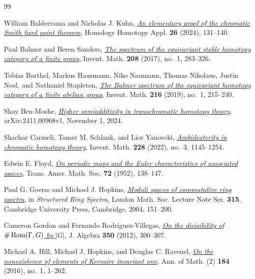 \begin{thebibliography}{99}

William Balderrama and Nicholas J. Kuhn,
\href{https://arxiv.org/abs/2303.02022}
{\emph{An elementary proof of the chromatic Smith fixed point theorem}},
Homology Homotopy Appl. \textbf{26} (2024), 131--140.

Paul Balmer and Beren Sanders,
\href{https://www.sas.rochester.edu/mth/sites/doug-ravenel/otherpapers/Spc_SHG.pdf}
{\emph{The spectrum of the equivariant stable homotopy category of a finite group}},
Invent. Math. \textbf{208} (2017), no.~1, 283--326.

Tobias Barthel, Markus Hausmann, Niko Naumann, Thomas Nikolaus,
Justin Noel, and Nathaniel Stapleton,
\href{https://doi.org/10.1007/s00222-018-0846-5}
{\emph{The Balmer spectrum of the equivariant homotopy category of a finite abelian group}},
Invent. Math. \textbf{216} (2019), no.~1, 215--240.

Shay Ben-Moshe,
\href{https://arxiv.org/abs/2411.00968v1}
{\emph{Higher semiadditivity in transchromatic homotopy theory}},
arXiv:2411.00968v1, November 1, 2024.

Shachar Carmeli, Tomer M. Schlank, and Lior Yanovski,
\href{https://doi.org/10.1007/s00222-022-01099-9}
{\emph{Ambidexterity in chromatic homotopy theory}},
Invent. Math. \textbf{228} (2022), no.~3, 1145--1254.

Edwin E. Floyd,
\href{https://doi.org/10.1090/S0002-9947-1952-0046039-4}
{\emph{On periodic maps and the Euler characteristics of associated spaces}},
Trans. Amer. Math. Soc. \textbf{72} (1952), 138--147.

Paul G. Goerss and Michael J. Hopkins,
\href{https://doi.org/10.1017/CBO9780511529955.009}
{\emph{Moduli spaces of commutative ring spectra}},
in \emph{Structured Ring Spectra}, London Math. Soc. Lecture Note Ser.
\textbf{315}, Cambridge University Press, Cambridge, 2004, 151--200.

Cameron Gordon and Fernando Rodriguez-Villegas,
\href{https://doi.org/10.1016/j.jalgebra.2011.09.040}
{\emph{On the divisibility of \(\#\operatorname{Hom}(\Gamma,G)\) by \(|G|\)}},
J. Algebra \textbf{350} (2012), 300--307.

Michael A. Hill, Michael J. Hopkins, and Douglas C. Ravenel,
\href{https://doi.org/10.4007/annals.2016.184.1.1}
{\emph{On the nonexistence of elements of Kervaire invariant one}},
Ann. of Math. (2) \textbf{184} (2016), no.~1, 1--262.


\end{thebibliography}
